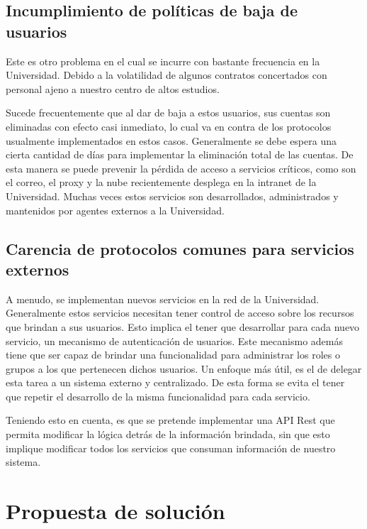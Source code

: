 \subsection{Incumplimiento de políticas de baja de usuarios}

Este es otro problema en el cual se incurre con bastante frecuencia en la Universidad. 
Debido a la volatilidad de algunos contratos concertados con personal ajeno a nuestro 
centro de altos estudios. 

Sucede frecuentemente que al dar de baja a estos usuarios, sus cuentas son eliminadas con 
efecto casi inmediato, lo cual va en contra de los protocolos usualmente implementados en 
estos casos. Generalmente se debe espera una cierta cantidad de días para implementar la 
eliminación total de las cuentas. De esta manera se puede prevenir la pérdida de acceso a 
servicios críticos, como son el correo, el proxy y la nube recientemente desplega en la 
intranet de la Universidad. Muchas veces estos servicios son desarrollados, administrados 
y mantenidos por agentes externos a la Universidad. 


\subsection{Carencia de protocolos comunes para servicios externos}

A menudo, se implementan nuevos servicios en la red de la Universidad. Generalmente estos
servicios necesitan tener control de acceso sobre los recursos que brindan a sus usuarios.
Esto implica el tener que desarrollar para cada nuevo servicio, un mecanismo de 
autenticación de usuarios. Este mecanismo además tiene que ser capaz de brindar una 
funcionalidad para administrar los roles o grupos a los que pertenecen dichos usuarios.
Un enfoque más útil, es el de delegar esta tarea a un sistema externo y centralizado. De
esta forma se evita el tener que repetir el desarrollo de la misma funcionalidad para cada
servicio.

Teniendo esto en cuenta, es que se pretende implementar una API Rest que permita modificar 
la lógica detrás de la información brindada, sin que esto implique modificar todos los 
servicios que consuman información de nuestro sistema.

\section{Propuesta de solución}

